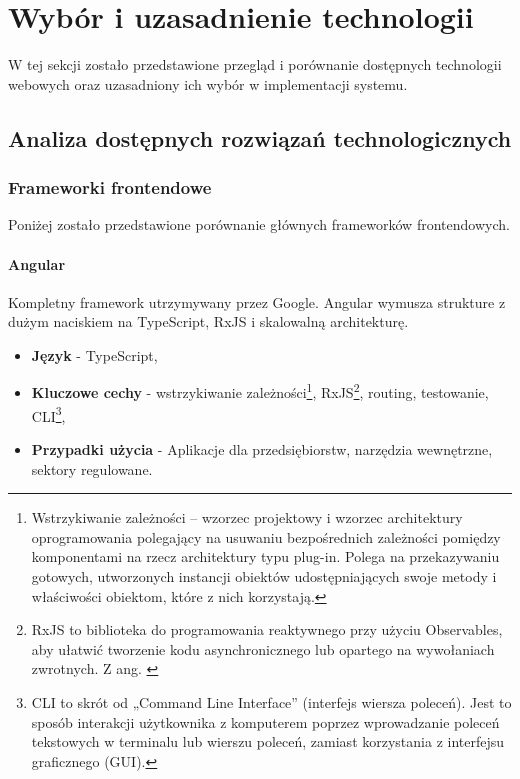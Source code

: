 %


\chapter{Wybór i uzasadnienie technologii}
\label{rozdzial2}

W tej sekcji zostało przedstawione przegląd i porównanie dostępnych technologii webowych oraz uzasadniony ich wybór w implementacji systemu.

\section{Analiza dostępnych rozwiązań technologicznych}

\subsection{Frameworki frontendowe}
Poniżej zostało przedstawione porównanie głównych frameworków frontendowych.\cite{reactvsvuevsangularvsnextjs}

\subsubsection{Angular}
Kompletny framework utrzymywany przez Google. Angular wymusza strukture z dużym naciskiem na TypeScript, RxJS i skalowalną architekturę.
\begin{itemize}
	\item \textbf{Język} - TypeScript,
	\item \textbf{Kluczowe cechy} - wstrzykiwanie zależności\footnote{Wstrzykiwanie zależności – wzorzec projektowy i wzorzec architektury oprogramowania polegający na usuwaniu bezpośrednich zależności pomiędzy komponentami na rzecz architektury typu plug-in. Polega na przekazywaniu gotowych, utworzonych instancji obiektów udostępniających swoje metody i właściwości obiektom, które z nich korzystają.}, RxJS\footnote{RxJS to biblioteka do programowania reaktywnego przy użyciu Observables, aby ułatwić tworzenie kodu asynchronicznego lub opartego na wywołaniach zwrotnych. Z ang. \cite{rxjs.dev}}, routing, testowanie, CLI\footnote{CLI to skrót od „Command Line Interface” (interfejs wiersza poleceń). Jest to sposób interakcji użytkownika z komputerem poprzez wprowadzanie poleceń tekstowych w terminalu lub wierszu poleceń, zamiast korzystania z interfejsu graficznego (GUI).},
	\item \textbf{Przypadki użycia} - Aplikacje dla przedsiębiorstw, narzędzia wewnętrzne, sektory regulowane.
\end{itemize}

